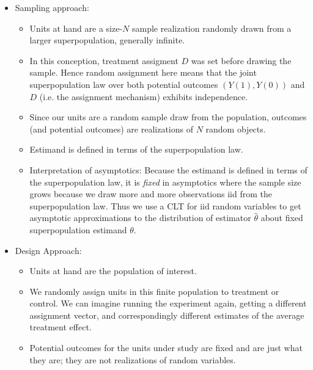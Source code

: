 \documentclass[12pt]{article}
\theoremstyle{plain}
\theoremstyle{definition}
\theoremstyle{remark}
\begin{document}
\clearpage
\begin{itemize}
  \item Sampling approach:
    \begin{itemize}
      \item
        Units at hand are a size-$N$ sample realization randomly drawn
        from a larger superpopulation, generally infinite.

      \item
        In this conception, treatment assigment $D$ was set before
        drawing the sample.
        Hence random assignment here means that the joint
        superpopulation law over both potential outcomes $(Y(1),Y(0))$
        and $D$ (i.e. the assignment mechanism) exhibits independence.

      \item Since our units are a random sample draw from the
        population, outcomes (and potential outcomes) are realizations
        of $N$ random objects.

      \item Estimand is defined in terms of the superpopulation law.

      \item Interpretation of asymptotics:
        Because the estimand is defined in terms of the superpopulation
        law, it is \emph{fixed} in asymptotics where the sample size
        grows because we draw more and more observations iid from the
        superpopulation law.
        Thus we use a CLT for iid random variables to get asymptotic
        approximations to the distribution of estimator $\hat{\theta}$
        about fixed superpopulation estimand $\theta$.
    \end{itemize}

  \item Design Approach:
    \begin{itemize}
      \item Units at hand are the population of interest.
      \item
        We randomly assign units in this finite population to treatment
        or control.
        We can imagine running the experiment again, getting a different
        assignment vector, and correspondingly different estimates of
        the average treatment effect.

      \item Potential outcomes for the units under study are fixed and
        are just what they are; they are not realizations of random
        variables.


\end{itemize}
\end{itemize}
\end{document}
